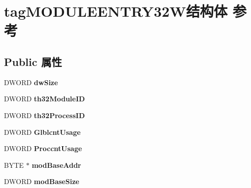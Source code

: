 \hypertarget{structtag_m_o_d_u_l_e_e_n_t_r_y32_w}{}\section{tag\+M\+O\+D\+U\+L\+E\+E\+N\+T\+R\+Y32\+W结构体 参考}
\label{structtag_m_o_d_u_l_e_e_n_t_r_y32_w}
\subsection*{Public 属性}
\begin{DoxyCompactItemize}
\item 
\mbox{\label{structtag_m_o_d_u_l_e_e_n_t_r_y32_w_a0606687176692d117c5921235572249d}} 
D\+W\+O\+RD {\bfseries dw\+Size}
\item 
\mbox{\label{structtag_m_o_d_u_l_e_e_n_t_r_y32_w_a8171f91104bb099cc05ba1f467570f4f}} 
D\+W\+O\+RD {\bfseries th32\+Module\+ID}
\item 
\mbox{\label{structtag_m_o_d_u_l_e_e_n_t_r_y32_w_a052a64e39dcd2f218eb50da297790f45}} 
D\+W\+O\+RD {\bfseries th32\+Process\+ID}
\item 
\mbox{\label{structtag_m_o_d_u_l_e_e_n_t_r_y32_w_afbfc4c01bdd5066eda294aaf6fe16aa5}} 
D\+W\+O\+RD {\bfseries Glblcnt\+Usage}
\item 
\mbox{\label{structtag_m_o_d_u_l_e_e_n_t_r_y32_w_ab527abfff648e923dac5def167cc7d2f}} 
D\+W\+O\+RD {\bfseries Proccnt\+Usage}
\item 
\mbox{\label{structtag_m_o_d_u_l_e_e_n_t_r_y32_w_a2aee20ebbb8a9028248ee25657330b8c}} 
B\+Y\+TE $\ast$ {\bfseries mod\+Base\+Addr}
\item 
\mbox{\label{structtag_m_o_d_u_l_e_e_n_t_r_y32_w_ac3097b658188d873679ab62b696693ac}} 
D\+W\+O\+RD {\bfseries mod\+Base\+Size}
\item 
\mbox{\label{structtag_m_o_d_u_l_e_e_n_t_r_y32_w_aba65bfb0d4394256bb2bd463015478c4}} 

\end{DoxyCompactItemize}
